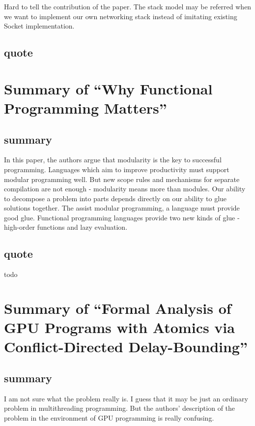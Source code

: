 \documentclass{llncs}
\begin{document}
Hard to tell the contribution of the paper. The stack model may be referred when
we want to implement our own networking stack instead of imitating existing
Socket implementation.

\subsection{quote}


\newpage
\section{Summary of ``Why Functional Programming Matters''\cite{Hughes1984Why}} 
  \label{section:why_fp_matters}
\subsection{summary}
In this paper, the authors argue that modularity is the key to successful
programming. Languages which aim to improve productivity must support modular
programming well. But new scope rules and mechanisms for separate compilation
are not enough - modularity means more than modules. Our ability to decompose a
problem into parts depends directly on our ability to glue solutions
together. The assist modular programming, a language must provide good glue.
Functional programming languages provide two new kinds of glue - high-order
functions and lazy evaluation.
\subsection{quote}
todo


\newpage
\section{Summary of ``Formal Analysis of GPU Programs with Atomics 
via Conflict-Directed Delay-Bounding''\cite{Chiang2013Formal}} 
  \label{section:gpu_atomics_conflict}
\subsection{summary}
I am not sure what the problem really is. I guess that it may be just an ordinary
problem in multithreading programming. But the authors' description of the problem
in the environment of GPU programming is really confusing. 
\end{document}
